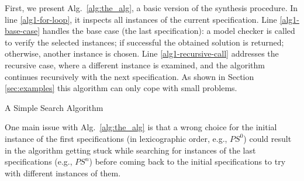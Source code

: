 First, we present Alg.~\ref{alg:the_alg},  a basic  version of the synthesis procedure. 
In line \ref{alg1-for-loop}, it inspects all instances of the current specification.  Line \ref{alg1-base-case} handles the base case (the last specification): a model checker is called to verify the selected instances; if successful the obtained solution is returned; otherwise, another instance is chosen. Line \ref{alg1-recursive-call} addresses the recursive case, where a different instance is examined, and the algorithm continues recursively with the next specification.
As shown in Section \ref{sec:examples}  this algorithm can only cope with small problems. 
{\scriptsize
\begin{algorithm*}[t]
\caption{A Simple Search Algorithm}
\label{alg:the_alg}
{}
%
\end{algorithm*}
}
One main issue with Alg.~\ref{alg:the_alg} is that a wrong choice for the initial instance of the first specifications  (in lexicographic order, e.g., $\textit{PS}^0$) could result in the algorithm
getting stuck while searching for instances of the last specifications (e.g.,  $\textit{PS}^n$) before coming back to the initial specifications to try with different instances of them.  

